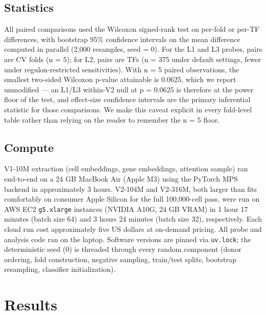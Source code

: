 \documentclass[10pt]{article}
\begin{document}
\subsection{Statistics}\label{statistics}

All paired comparisons used the Wilcoxon signed-rank test \citep{wilcoxon1945} on per-fold or per-TF differences, with bootstrap 95\% confidence
intervals on the mean difference \citep{efron1979bootstrap} computed
in parallel (2,000 resamples, seed = 0). For the L1 and L3 probes, pairs are CV folds (n = 5); for
L2, pairs are TFs (n = 375 under default settings, fewer under
regulon-restricted sensitivities). With n = 5 paired observations, the
smallest two-sided Wilcoxon p-value attainable is 0.0625, which we
report unmodified --- an L1/L3 within-V2 null at p = 0.0625 is therefore
at the power floor of the test, and effect-size confidence intervals are
the primary inferential statistic for those comparisons. We make this
caveat explicit in every fold-level table rather than relying on the
reader to remember the n = 5 floor.

\subsection{Compute}\label{compute}

V1-10M extraction (cell embeddings, gene embeddings, attention sample)
ran end-to-end on a 24 GB MacBook Air (Apple M3) using the PyTorch MPS
backend in approximately 3 hours. V2-104M and V2-316M, both larger than
fits comfortably on consumer Apple Silicon for the full 100,000-cell
pass, were run on AWS EC2 \texttt{g5.xlarge} instances (NVIDIA A10G, 24
GB VRAM) in 1 hour 17 minutes (batch size 64) and 3 hours 24 minutes
(batch size 32), respectively. Each cloud run cost approximately five US
dollars at on-demand pricing. All probe and analysis code ran on the
laptop. Software versions are pinned via \texttt{uv.lock}; the
deterministic seed (0) is threaded through every random component (donor
ordering, fold construction, negative sampling, train/test splits,
bootstrap resampling, classifier initialization).

\section{Results}\label{results}
\end{document}
